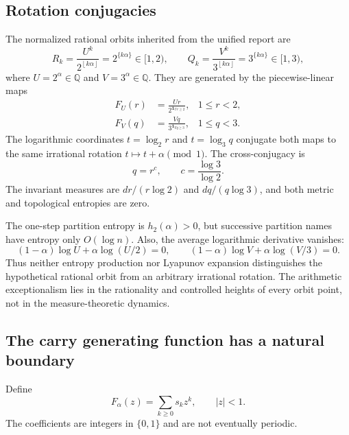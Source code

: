 \documentclass[11pt,oneside]{article}
\theoremstyle{definition}
\theoremstyle{remark}
\newcommand{\Q}{\mathbb{Q}}
\newcommand{\floor}[1]{\left\lfloor #1\right\rfloor}
\begin{document}
\subsection{Rotation conjugacies}

The normalized rational orbits inherited from the unified report are
\begin{equation}\label{eq:normalized-orbits}
 R_k=\frac{U^k}{2^{\floor{k\alpha}}}=2^{\{k\alpha\}}\in[1,2),
 \qquad
 Q_k=\frac{V^k}{3^{\floor{k\alpha}}}=3^{\{k\alpha\}}\in[1,3),
\end{equation}
where $U=2^\alpha\in\Q$ and $V=3^\alpha\in\Q$.  They are generated by the piecewise-linear maps
\begin{align}
 F_U(r)&=\frac{Ur}{2^{\mathbf 1_{Ur\geq2}}},&1\leq r<2,\label{eq:FU}\\
 F_V(q)&=\frac{Vq}{3^{\mathbf 1_{Vq\geq3}}},&1\leq q<3.\label{eq:FV}
\end{align}
The logarithmic coordinates $t=\log_2r$ and $t=\log_3q$ conjugate both maps to the same irrational rotation $t\mapsto t+\alpha\pmod1$.  The cross-conjugacy is
\begin{equation}\label{eq:cross-conjugacy}
 q=r^c,
 \qquad c=\frac{\log3}{\log2}.
\end{equation}
The invariant measures are $dr/(r\log2)$ and $dq/(q\log3)$, and both metric and topological entropies are zero.

The one-step partition entropy is $h_2(\alpha)>0$, but successive partition names have entropy only $O(\log n)$.  Also, the average logarithmic derivative vanishes:
\begin{equation}\label{eq:lyap-zero}
 (1-\alpha)\log U+\alpha\log(U/2)=0,
 \qquad
 (1-\alpha)\log V+\alpha\log(V/3)=0.
\end{equation}
Thus neither entropy production nor Lyapunov expansion distinguishes the hypothetical rational orbit from an arbitrary irrational rotation.  The arithmetic exceptionalism lies in the rationality and controlled heights of every orbit point, not in the measure-theoretic dynamics.

\subsection{The carry generating function has a natural boundary}

Define
\begin{equation}\label{eq:carry-series}
 F_\alpha(z)=\sum_{k\geq0}s_kz^k,
 \qquad |z|<1.
\end{equation}
The coefficients are integers in $\{0,1\}$ and are not eventually periodic.
\end{document}
